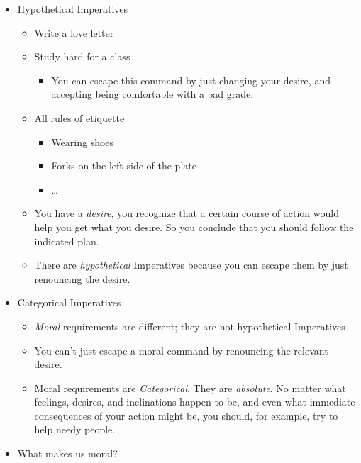\documentclass{article}
\begin{document}
\begin{spacing}{1.2}
    \newpage
    \begin{itemize}
        \item Hypothetical Imperatives
              \begin{itemize}
                  \item Write a love letter
                  \item Study hard for a class
                        \begin{itemize}
                            \item You can escape this command by just changing your desire, and accepting being comfortable with a bad grade.
                        \end{itemize}
                  \item All rules of etiquette
                        \begin{itemize}
                            \item Wearing shoes
                            \item Forks on the left side of the plate
                            \item \ldots
                        \end{itemize}
                  \item You have a \emph{desire}, you recognize that a certain course of action would help you get what you desire. So you conclude that you should follow the indicated plan.
                  \item There are \emph{hypothetical} Imperatives because you can escape them by just renouncing the desire.
              \end{itemize}
        \item Categorical Imperatives
              \begin{itemize}
                  \item \emph{Moral} requirements are different; they are not hypothetical Imperatives
                  \item You can't just escape a moral command by renouncing the relevant desire.
                  \item Moral requirements are \emph{Categorical}. They are \emph{absolute}. No matter what feelings, desires, and inclinations happen to be, and even what immediate consequences of your action might be, you should, for example, try to help needy people.
              \end{itemize}
        \item What makes us moral?

\end{itemize}
\end{spacing}
\end{document}
